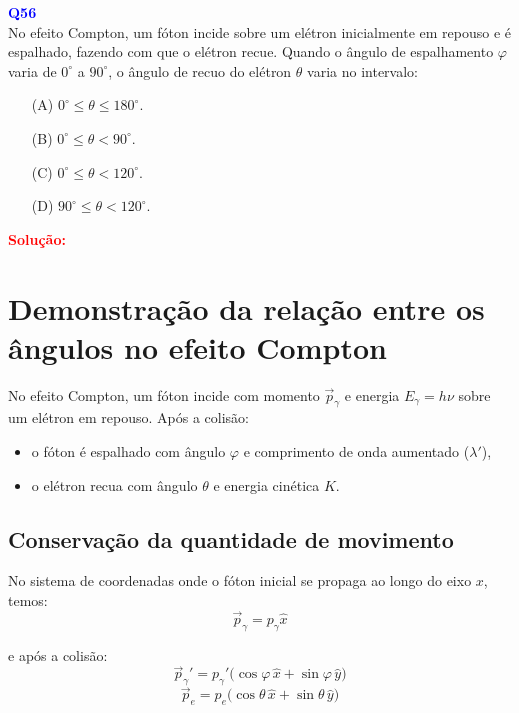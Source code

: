 \documentclass[a4paper,12pt]{article}
\begin{document}
\begin{flushleft}
\textbf{\textcolor{blue}{\Large Q56}}\\
\noindent
No efeito Compton, um fóton incide sobre um elétron inicialmente em repouso e é espalhado, fazendo com que o elétron recue.  
Quando o ângulo de espalhamento \( \varphi \) varia de \(0^\circ\) a \(90^\circ\), o ângulo de recuo do elétron \( \theta \) 
varia no intervalo:


\begin{itemize}
\item[(A)] $0^{\circ} \leq \theta \leq 180^{\circ}$.
\item[(B)] $0^{\circ} \leq \theta < 90^{\circ}$.
\item[(C)] $0^{\circ} \leq \theta < 120^{\circ}$.
\item[(D)] $90^{\circ} \leq \theta < 120^{\circ}$.
\end{itemize}

\vspace{0.5cm}

\textcolor{red}{\textbf{Solução:}}\\

\section*{Demonstração da relação entre os ângulos no efeito Compton}

No efeito Compton, um fóton incide com momento \( \vec{p}_\gamma \) e energia \( E_\gamma = h\nu \) sobre um elétron em repouso.  
Após a colisão:
\begin{itemize}
    \item o fóton é espalhado com ângulo \( \varphi \) e comprimento de onda aumentado (\( \lambda' \)),
    \item o elétron recua com ângulo \( \theta \) e energia cinética \( K \).
\end{itemize}

\subsection*{Conservação da quantidade de movimento}

No sistema de coordenadas onde o fóton inicial se propaga ao longo do eixo \(x\), temos:
\[
\vec{p}_\gamma = p_\gamma \hat{x}
\]

e após a colisão:
\[
\vec{p}_\gamma' = p_\gamma' \bigl( \cos\varphi\,\hat{x} + \sin\varphi\,\hat{y} \bigr)
\]
\[
\vec{p}_e = p_e \bigl( \cos\theta\,\hat{x} + \sin\theta\,\hat{y} \bigr)
\]


\end{flushleft}
\end{document}
